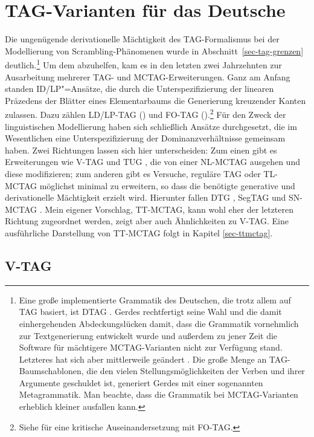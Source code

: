 \section{TAG-Varianten für das Deutsche} \label{sec-tag-varianten}

Die ungenügende derivationelle Mächtigkeit des TAG-Formalismus bei der Modellierung von Scrambling-Phänomenen wurde in Abschnitt~\ref{sec-tag-grenzen} deutlich.\footnote{Eine große implementierte Grammatik des Deutschen, die trotz allem auf TAG basiert, ist DTAG \citep{Gerdes:02,Gerdes:02b}. Gerdes rechtfertigt seine Wahl und die damit einhergehenden Abdeckungslücken damit, dass die Grammatik vornehmlich zur Textgenerierung entwickelt wurde und außerdem zu jener Zeit die Software für mächtigere MCTAG-Varianten nicht zur Verfügung stand. Letzteres hat sich aber mittlerweile geändert \citep{Parmentier:etal:07,Kallmeyer:etal:08}. Die große Menge an TAG-Baumschablonen, die den vielen Stellungsmöglichkeiten der Verben und ihrer Argumente geschuldet ist, generiert Gerdes mit einer sogenannten Metagrammatik. Man beachte, dass die Grammatik bei MCTAG-Varianten erheblich kleiner ausfallen kann.} Um dem abzuhelfen, kam es in den letzten zwei Jahrzehnten zur Ausarbeitung mehrerer TAG- und MCTAG-Erweiterungen. Ganz am Anfang standen ID/LP"=Ansätze, die durch die Unterspezifizierung der linearen Präzedens der Blätter eines Elementarbaums die Generierung kreuzender Kanten zulassen. Dazu zählen LD/LP-TAG (\citealt{Joshi:87b, Joshi:etal:90}) und FO-TAG (\citealt{Becker:Joshi:Rambow:91, Becker:94}).\footnote{Siehe \citet[43ff]{Rambow:94} für eine kritische Auseinandersetzung mit FO-TAG.} Für den Zweck der linguistischen Modellierung haben sich schlie\ss lich Ansätze durchgesetzt, die im Wesentlichen eine Unterspezifizierung der Dominanzverhältnisse gemeinsam haben. Zwei Richtungen lassen sich hier unterscheiden: Zum einen gibt es Erweiterungen wie V-TAG \citep{Rambow:94} und TUG \citep{Gerdes:04}, die von einer NL-MCTAG ausgehen und diese modifizieren; zum anderen gibt es Versuche, reguläre TAG oder TL-MCTAG möglichst minimal zu erweitern, so dass die benötigte generative und derivationelle Mächtigkeit erzielt wird. Hierunter fallen DTG \citep{Rambow:etal:95}, SegTAG \citep{Kulick:00} und SN-MCTAG \citep{Kallmeyer:05}. Mein eigener Vorschlag, TT-MCTAG, kann wohl eher der letzteren  Richtung zugeordnet werden, zeigt aber auch Ähnlichkeiten zu V-TAG. Eine ausführliche Darstellung von TT-MCTAG folgt in Kapitel \ref{sec-ttmctag}. 

\subsection{V-TAG} \label{sec-tag-varianten-vtag}


